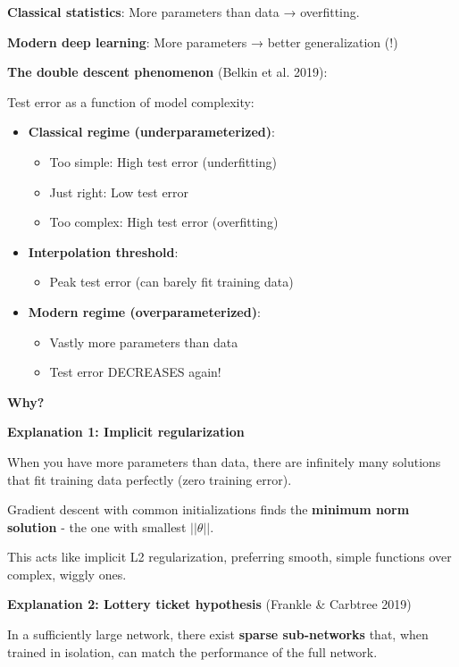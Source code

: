 \documentclass[11pt,oneside]{book}
\begin{document}
\textbf{Classical statistics}: More parameters than data → overfitting.

\textbf{Modern deep learning}: More parameters → better generalization (!)

\textbf{The double descent phenomenon} (Belkin et al. 2019):

Test error as a function of model complexity:
\begin{itemize}
\item \textbf{Classical regime (underparameterized)}:
  \begin{itemize}
  \item Too simple: High test error (underfitting)
  \item Just right: Low test error
  \item Too complex: High test error (overfitting)
  \end{itemize}

\item \textbf{Interpolation threshold}:
  \begin{itemize}
  \item Peak test error (can barely fit training data)
  \end{itemize}

\item \textbf{Modern regime (overparameterized)}:
  \begin{itemize}
  \item Vastly more parameters than data
  \item Test error DECREASES again!
  \end{itemize}
\end{itemize}

\textbf{Why?}

\textbf{Explanation 1: Implicit regularization}

When you have more parameters than data, there are infinitely many solutions that fit training data perfectly (zero training error).

Gradient descent with common initializations finds the \textbf{minimum norm solution} - the one with smallest $||\theta||$.

This acts like implicit L2 regularization, preferring smooth, simple functions over complex, wiggly ones.

\textbf{Explanation 2: Lottery ticket hypothesis} (Frankle \& Carbtree 2019)

In a sufficiently large network, there exist \textbf{sparse sub-networks} that, when trained in isolation, can match the performance of the full network.
\end{document}
